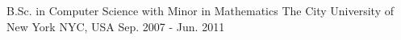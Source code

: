 

\begin{cventries}

  \cventry
    {B.Sc. in Computer Science with Minor in Mathematics} %
    {The City University of New York} %
    {NYC, USA} %
    {Sep. 2007 - Jun. 2011} %
    {
    }

\end{cventries}
